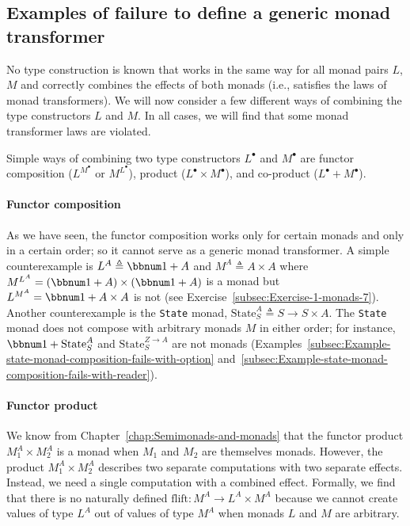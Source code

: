 \subsection{Examples of failure to define a generic monad transformer}

No type construction is known that works in the same way for all monad
pairs $L$, $M$ and correctly combines the effects of both monads
(i.e., satisfies the laws of monad transformers). We will now consider
a few different ways of combining the type constructors $L$ and $M$.
In all cases, we will find that some monad transformer laws are violated.

Simple ways of combining two type constructors $L^{\bullet}$ and
$M^{\bullet}$ are functor composition ($L^{M^{\bullet}}$ or $M^{L^{\bullet}}$),
product ($L^{\bullet}\times M^{\bullet}$), and co-product ($L^{\bullet}+M^{\bullet}$).

\paragraph{Functor composition}

As we have seen, the functor composition works only for certain monads
and only in a certain order; so it cannot serve as a generic monad
transformer. A simple counterexample is $L^{A}\triangleq\bbnum 1+A$
and $M^{A}\triangleq A\times A$ where $M^{L^{A}}=\left(\bbnum 1+A\right)\times\left(\bbnum 1+A\right)$
is a monad but $L^{M^{A}}=\bbnum 1+A\times A$ is not (see Exercise~\ref{subsec:Exercise-1-monads-7}).
Another counterexample is the \lstinline!State! monad, $\text{State}_{S}^{A}\triangleq S\rightarrow S\times A$.
The \lstinline!State! monad does not compose with arbitrary monads
$M$ in either order; for instance, $\bbnum 1+\text{State}_{S}^{A}$
and $\text{State}_{S}^{Z\rightarrow A}$ are not monads (Examples~\ref{subsec:Example-state-monad-composition-fails-with-option}
and~\ref{subsec:Example-state-monad-composition-fails-with-reader}). 

\paragraph{Functor product}

We know from Chapter~\ref{chap:Semimonads-and-monads} that the functor
product $M_{1}^{A}\times M_{2}^{A}$ is a monad when $M_{1}$ and
$M_{2}$ are themselves monads. However, the product $M_{1}^{A}\times M_{2}^{A}$
describes two separate computations with two separate effects. Instead,
we need a single computation with a combined effect. Formally, we
find that there is no naturally defined $\text{flift}:M^{A}\rightarrow L^{A}\times M^{A}$
because we cannot create values of type $L^{A}$ out of values of
type $M^{A}$ when monads $L$ and $M$ are arbitrary.


